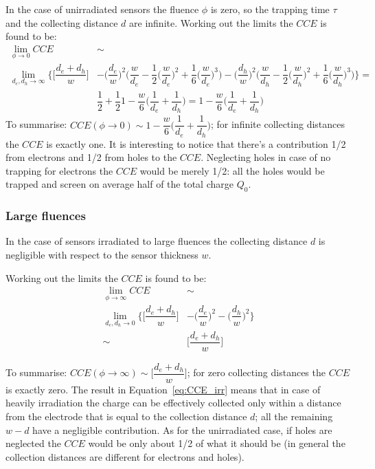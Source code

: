 In the case of unirradiated sensors the fluence $\phi$ is zero, so the trapping time $\tau$ and the 
collecting distance $d$ are infinite. Working out the limits the $CCE$ is found to be:
\begin{equation}
\begin{split}
\lim_{\phi \to 0}CCE & \sim \\ \lim_{d_e,d_h\to \infty}   \Big\{\Big[\dfrac{d_e+d_h}{w}\Big]&-\Big(\dfrac{d_e}{w}\Big)^2\Big(\dfrac{w}{d_e}-\dfrac{1}{2}\big(\dfrac{w}{d_e}\big)^2+\dfrac{1}{6}\big(\dfrac{w}{d_e}\big)^3\Big)-\Big(\dfrac{d_h}{w}\Big)^2\Big(\dfrac{w}{d_h}-\dfrac{1}{2}\big(\dfrac{w}{d_h}\big)^2+\dfrac{1}{6}\big(\dfrac{w}{d_h}\big)^3\Big)\Big\}=\\
&\dfrac{1}{2}+\dfrac{1}{2}1-\dfrac{w}{6}\Big(\dfrac{1}{d_e}+\dfrac{1}{d_h}\Big)=1-\dfrac{w}{6}\Big(\dfrac{1}{d_e}+\dfrac{1}{d_h}\Big)
\end{split}
\label{eq:CCE_unirr}
\end{equation}
To summarise: $CCE(\phi\to 0)\sim1-\dfrac{w}{6}\Big(\dfrac{1}{d_e}+\dfrac{1}{d_h}\Big)$; for infinite 
collecting distances the $CCE$ is exactly one. 
It is interesting to notice that there's a contribution 1/2 from electrons and 1/2 from holes to the 
$CCE$. Neglecting holes in case of no  trapping for electrons the $CCE$  would be merely 1/2: 
all the holes would be trapped and screen on average half of the total charge $Q_0$.

\subsubsection{Large fluences}
In the case of sensors irradiated to large fluences  the 
collecting distance $d$ is negligible with respect to the sensor thickness $w$.

Working out the limits the $CCE$ is found to be:
\begin{equation}
\begin{split}
\lim_{\phi \to \infty}CCE & \sim \\ 
\lim_{d_e,d_h\to 0}  \Big\{\Big[\dfrac{d_e+d_h}{w}\Big]& - \Big(\dfrac{d_e}{w}\Big)^2 -\Big(\dfrac{d_h}{w}\Big)^2\Big\}\\
\sim & \Big[\dfrac{d_e+d_h}{w}\Big]
\end{split}
\label{eq:CCE_irr}
\end{equation}

To summarise: $CCE(\phi\to \infty)\sim\Big[\dfrac{d_e+d_h}{w}\Big]$; for zero 
collecting distances the $CCE$ is exactly zero. 
The result  in Equation~\ref{eq:CCE_irr} means that in case of heavily irradiation the charge 
can be effectively collected only within a distance from the electrode that is equal to the collection distance $d$; all the remaining $w-d$ have a negligible contribution. As for the unirradiated case, if holes are neglected the $CCE$ would be only about 1/2 of what it should be (in general
 the collection distances are different for electrons and holes).


